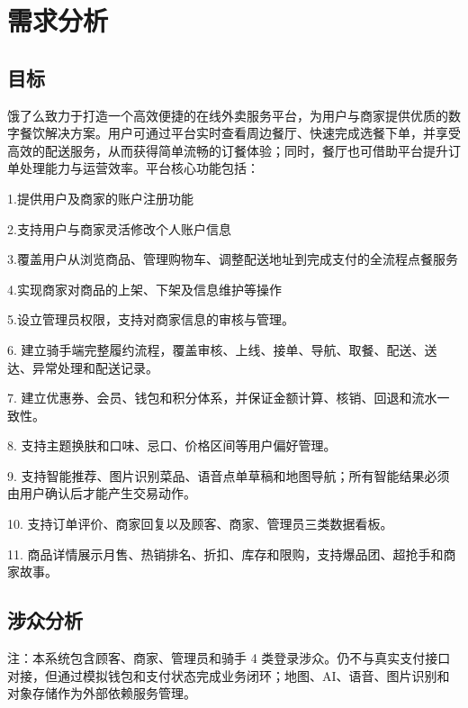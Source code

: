 \section{需求分析}\label{ux9700ux6c42ux5206ux6790}

\subsection{目标}\label{ux76eeux6807}

饿了么致力于打造一个高效便捷的在线外卖服务平台，为用户与商家提供优质的数字餐饮解决方案。用户可通过平台实时查看周边餐厅、快速完成选餐下单，并享受高效的配送服务，从而获得简单流畅的订餐体验；同时，餐厅也可借助平台提升订单处理能力与运营效率。平台核心功能包括：

1.提供用户及商家的账户注册功能

2.支持用户与商家灵活修改个人账户信息

3.覆盖用户从浏览商品、管理购物车、调整配送地址到完成支付的全流程点餐服务

4.实现商家对商品的上架、下架及信息维护等操作

5.设立管理员权限，支持对商家信息的审核与管理。

{\color{red}
6. 建立骑手端完整履约流程，覆盖审核、上线、接单、导航、取餐、配送、送达、异常处理和配送记录。

7. 建立优惠券、会员、钱包和积分体系，并保证金额计算、核销、回退和流水一致性。

8. 支持主题换肤和口味、忌口、价格区间等用户偏好管理。

9. 支持智能推荐、图片识别菜品、语音点单草稿和地图导航；所有智能结果必须由用户确认后才能产生交易动作。

10. 支持订单评价、商家回复以及顾客、商家、管理员三类数据看板。

11. 商品详情展示月售、热销排名、折扣、库存和限购，支持爆品团、超抢手和商家故事。
}

\subsection{涉众分析}\label{ux6d89ux4f17ux5206ux6790}

{\color{red}
注：本系统包含顾客、商家、管理员和骑手 4 类登录涉众。仍不与真实支付接口对接，但通过模拟钱包和支付状态完成业务闭环；地图、AI、语音、图片识别和对象存储作为外部依赖服务管理。
}

